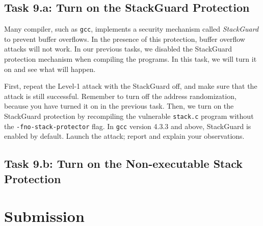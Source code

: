 \subsection{Task 9.a: Turn on the StackGuard Protection}

Many compiler, such as \texttt{gcc}, implements a security mechanism called
\textit{StackGuard} to prevent buffer overflows. In the presence of this
protection, buffer overflow attacks will not work.
In our previous tasks, we disabled the StackGuard protection mechanism
when compiling the programs. In this task, we will turn it on and
see what will happen.

First, repeat the Level-1 attack with the StackGuard off, and make sure that the
attack is still successful. Remember to turn off the address randomization, because
you have turned it on in the previous task.
Then, we turn on the StackGuard protection by
recompiling the vulnerable \texttt{stack.c} program without the
\texttt{-fno-stack-protector} flag.
In \texttt{gcc} version 4.3.3 and above, StackGuard is enabled by
default. Launch the attack; report and explain your observations.



\subsection{Task 9.b: Turn on the Non-executable Stack Protection}





\section{Submission}




